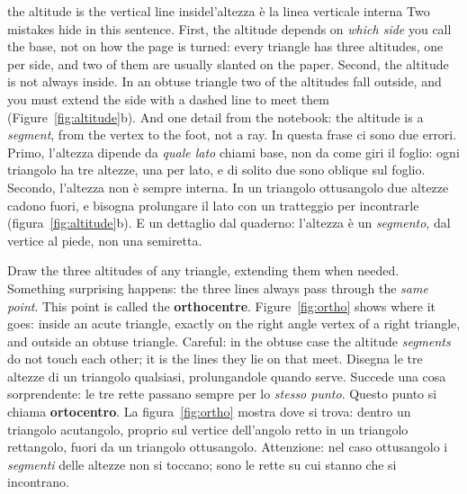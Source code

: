 \begin{trap}{the altitude is the vertical line inside}{l'altezza è la linea verticale interna}
Two mistakes hide in this sentence. First, the altitude depends on \emph{which side} you call the base, not on how the page is turned: every triangle has three altitudes, one per side, and two of them are usually slanted on the paper. Second, the altitude is not always inside. In an obtuse triangle two of the altitudes fall outside, and you must extend the side with a dashed line to meet them (Figure~\ref{fig:altitude}b). And one detail from the notebook: the altitude is a \emph{segment}, from the vertex to the foot, not a ray.
\tcblower
In questa frase ci sono due errori. Primo, l'altezza dipende da \emph{quale lato} chiami base, non da come giri il foglio: ogni triangolo ha tre altezze, una per lato, e di solito due sono oblique sul foglio. Secondo, l'altezza non è sempre interna. In un triangolo ottusangolo due altezze cadono fuori, e bisogna prolungare il lato con un tratteggio per incontrarle (figura~\ref{fig:altitude}b). E un dettaglio dal quaderno: l'altezza è un \emph{segmento}, dal vertice al piede, non una semiretta.
\end{trap}

\begin{bi}
Draw the three altitudes of any triangle, extending them when needed. Something surprising happens: the three lines always pass through the \emph{same point}. This point is called the \textbf{orthocentre}. Figure~\ref{fig:ortho} shows where it goes: inside an acute triangle, exactly on the right angle vertex of a right triangle, and outside an obtuse triangle. Careful: in the obtuse case the altitude \emph{segments} do not touch each other; it is the lines they lie on that meet.
\IT
Disegna le tre altezze di un triangolo qualsiasi, prolungandole quando serve. Succede una cosa sorprendente: le tre rette passano sempre per lo \emph{stesso punto}. Questo punto si chiama \textbf{ortocentro}. La figura~\ref{fig:ortho} mostra dove si trova: dentro un triangolo acutangolo, proprio sul vertice dell'angolo retto in un triangolo rettangolo, fuori da un triangolo ottusangolo. Attenzione: nel caso ottusangolo i \emph{segmenti} delle altezze non si toccano; sono le rette su cui stanno che si incontrano.
\end{bi}

